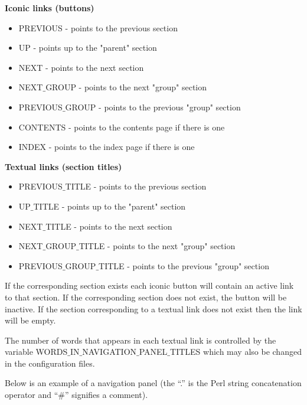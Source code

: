 {\bf Iconic links (buttons)}
\begin{itemize}
\item PREVIOUS - points to the previous section 
\item UP  - points up to the "parent" section
\item NEXT - points to the next section
\item NEXT$\_$GROUP - points to the next "group" section
\item PREVIOUS$\_$GROUP - points to the previous "group" section
\item CONTENTS - points to the contents page if there is one
\item INDEX - points to the index page if there is one
\end{itemize}

{\bf Textual links (section titles)}
\begin{itemize}
\item PREVIOUS$\_$TITLE - points to the previous section
\item UP$\_$TITLE  - points up to the "parent" section
\item NEXT$\_$TITLE - points to the next section
\item NEXT$\_$GROUP$\_$TITLE - points to the next "group" section
\item PREVIOUS$\_$GROUP$\_$TITLE - points to the previous "group" section
\end{itemize}

If the corresponding section exists each iconic button will contain an
active link to that section. If the corresponding section does
not exist, the button will be inactive. If the section corresponding
to a textual link does not exist then the link will be empty.

The number of words that appears in each textual link
is controlled by the variable {\fn WORDS$\_$IN$\_$NAVIGATION$\_$PANEL$\_$TITLES}
which may also be changed in the configuration files.

Below is an example of a navigation panel 
(the ``.'' is the Perl string concatenation operator and ``\#''
signifies
a comment).

